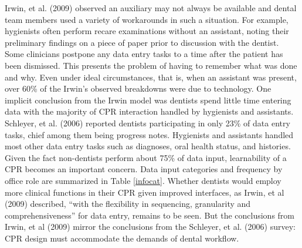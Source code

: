 \documentclass[11pt]{article}
\begin{document}
Irwin, et al. (2009) observed an auxiliary may not always be available and dental team members used a variety of workarounds in such a situation. For example, hygienists often perform recare examinations without an assistant, noting their preliminary findings on a piece of paper prior to discussion with the dentist. Some clinicians postpone any data entry tasks to a time after the patient has been dismissed. This presents the problem of having to remember what was done and why. Even under ideal circumstances, that is, when an assistant was present, over 60\% of the Irwin's observed breakdowns were due to technology. One implicit conclusion from the Irwin model was dentists spend little time entering data with the majority of CPR interaction handled by hygienists and assistants. Schleyer, et al. (2006) reported dentists participating in only 23\% of data entry tasks, chief among them being progress notes. Hygienists and assistants handled most other data entry tasks such as diagnoses, oral health status, and histories. Given the fact non-dentists perform about 75\% of data input, learnability of a CPR becomes an important concern. Data input categories and frequency by office role are summarized in Table \ref{infocat}. Whether dentists would employ more clinical functions in their CPR given improved interfaces, as Irwin, et al (2009) described, ``with the flexibility in sequencing, granularity and comprehensiveness'' for data entry, remains to be seen. But the conclusions from Irwin, et al (2009) mirror the conclusions from the Schleyer, et al. (2006) survey: CPR design must accommodate the demands of dental workflow.
\end{document}
